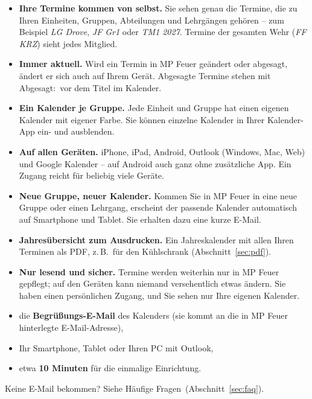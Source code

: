 \documentclass[a4paper,fontsize=10pt]{scrartcl}
\begin{document}
\begin{itemize}
  \item \textbf{Ihre Termine kommen von selbst.} Sie sehen genau die Termine,
        die zu Ihren Einheiten, Gruppen, Abteilungen und Lehrgängen gehören --
        zum Beispiel \emph{LG Drove}, \emph{JF Gr1} oder \emph{TM1 2027}.
        Termine der gesamten Wehr (\emph{FF KRZ}) sieht jedes Mitglied.
  \item \textbf{Immer aktuell.} Wird ein Termin in MP Feuer geändert oder
        abgesagt, ändert er sich auch auf Ihrem Gerät. Abgesagte Termine
        stehen mit \glqq Abgesagt:\grqq\ vor dem Titel im Kalender.
  \item \textbf{Ein Kalender je Gruppe.} Jede Einheit und Gruppe hat einen
        eigenen Kalender mit eigener Farbe. Sie können einzelne Kalender in
        Ihrer Kalender-App ein- und ausblenden.
  \item \textbf{Auf allen Geräten.} iPhone, iPad, Android, Outlook (Windows,
        Mac, Web) und Google Kalender -- auf Android auch ganz ohne
        zusätzliche App. Ein Zugang reicht für beliebig viele Geräte.
  \item \textbf{Neue Gruppe, neuer Kalender.} Kommen Sie in MP Feuer in eine
        neue Gruppe oder einen Lehrgang, erscheint der passende Kalender
        automatisch auf Smartphone und Tablet. Sie erhalten dazu eine kurze
        E-Mail.
  \item \textbf{Jahresübersicht zum Ausdrucken.} Ein Jahreskalender mit allen
        Ihren Terminen als PDF, z.\,B.\ für den Kühlschrank (Abschnitt~\ref{sec:pdf}).
  \item \textbf{Nur lesend und sicher.} Termine werden weiterhin nur in
        MP Feuer gepflegt; auf den Geräten kann niemand versehentlich etwas
        ändern. Sie haben einen persönlichen Zugang, und Sie sehen nur Ihre
        eigenen Kalender.
\end{itemize}

\begin{dshinweis}[title={Das brauchen Sie}]
\begin{itemize}[leftmargin=1.2em]
  \item die \textbf{Begrüßungs-E-Mail} des Kalenders (sie kommt an die in
        MP Feuer hinterlegte E-Mail-Adresse),
  \item Ihr Smartphone, Tablet oder Ihren PC mit Outlook,
  \item etwa \textbf{10 Minuten} für die einmalige Einrichtung.
\end{itemize}
Keine E-Mail bekommen? Siehe \glqq Häufige Fragen\grqq\ (Abschnitt~\ref{sec:faq}).
\end{dshinweis}
\end{document}

